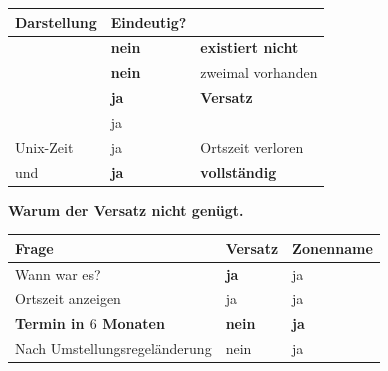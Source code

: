 \begin{merksatz}
\begin{center}
{\small
\renewcommand{\arraystretch}{1.5}
\begin{tabular}{@{}P{3.0cm}P{2.4cm}P{2.6cm}@{}}
\toprule
\textbf{Darstellung} & \textbf{Eindeutig?} & \\
\midrule
{} & \textcolor{akzent}{\textbf{nein}} & \textcolor{akzent}{\textbf{existiert nicht}}\\
 & \textcolor{akzent}{\textbf{nein}} & \textcolor{akzent}{zweimal vorhanden}\\
 & \textcolor{gruen}{\textbf{ja}} & \textbf{Versatz}\\
 & \textcolor{gruen}{ja} & \\
Unix-Zeit & \textcolor{gruen}{ja} & \textcolor{akzent}{Ortszeit verloren}\\
 und  & \textcolor{gruen}{\textbf{ja}} & \textcolor{gruen}{\textbf{vollständig}}\\
\bottomrule
\end{tabular}}
\end{center}

\begin{center}
\begin{minipage}{0.88\textwidth}
\end{minipage}
\end{center}

\textbf{Warum der Versatz nicht genügt.}

\begin{center}
\renewcommand{\arraystretch}{1.5}
\begin{tabular}{@{}P{2.8cm}P{2.4cm}P{2.8cm}@{}}
\toprule
\textbf{Frage} & \textbf{Versatz} & \textbf{Zonenname}\\
\midrule
Wann war es? & \textcolor{gruen}{\textbf{ja}} & \textcolor{gruen}{ja}\\
Ortszeit anzeigen & \textcolor{gruen}{ja} & \textcolor{gruen}{ja}\\
\textbf{Termin in $6$ Monaten} & \textcolor{akzent}{\textbf{nein}} & \textcolor{gruen}{\textbf{ja}}\\
Nach Umstellungsregeländerung & \textcolor{akzent}{nein} & \textcolor{gruen}{ja}\\
\bottomrule
\end{tabular}
\end{center}


\end{merksatz}
